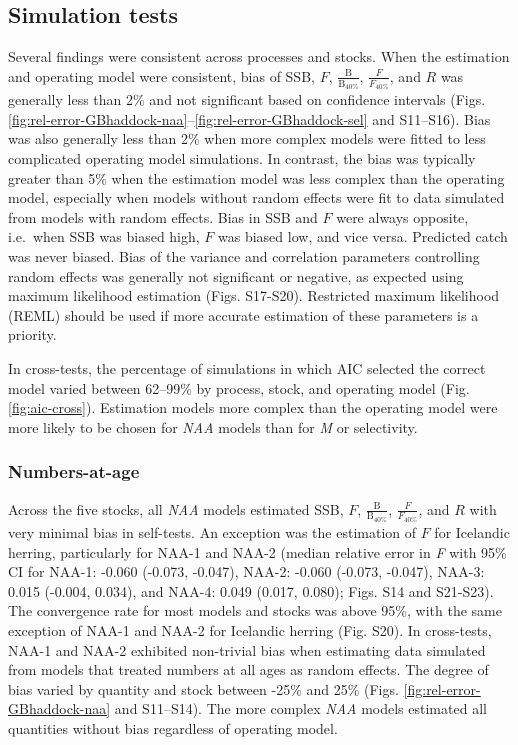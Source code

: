 \documentclass[]{article}
\begin{document}
\hypertarget{simulation-tests-1}{%
\subsection{Simulation tests}\label{simulation-tests-1}}

Several findings were consistent across processes and stocks. When the
estimation and operating model were consistent, bias of SSB, \(F\),
\(\frac{\text{B}}{\text{B}_{40\%}}\), \(\frac{F}{F_{40\%}}\), and \(R\)
was generally less than 2\% and not significant based on confidence
intervals (Figs.
\ref{fig:rel-error-GBhaddock-naa}--\ref{fig:rel-error-GBhaddock-sel} and
S11--S16). Bias was also generally less than 2\% when more complex
models were fitted to less complicated operating model simulations. In
contrast, the bias was typically greater than 5\% when the estimation
model was less complex than the operating model, especially when models
without random effects were fit to data simulated from models with
random effects. Bias in SSB and \(F\) were always opposite, i.e.~when
SSB was biased high, \(F\) was biased low, and vice versa. Predicted
catch was never biased. Bias of the variance and correlation parameters
controlling random effects was generally not significant or negative, as
expected using maximum likelihood estimation (Figs. S17-S20). Restricted
maximum likelihood (REML) should be used if more accurate estimation of
these parameters is a priority.

In cross-tests, the percentage of simulations in which AIC selected the
correct model varied between 62--99\% by process, stock, and operating
model (Fig. \ref{fig:aic-cross}). Estimation models more complex than
the operating model were more likely to be chosen for \emph{NAA} models
than for \emph{M} or selectivity.

\hypertarget{numbers-at-age}{%
\subsubsection{Numbers-at-age}\label{numbers-at-age}}

Across the five stocks, all \emph{NAA} models estimated SSB, \(F\),
\(\frac{\text{B}}{\text{B}_{40\%}}\), \(\frac{F}{F_{40\%}}\), and \(R\)
with very minimal bias in self-tests. An exception was the estimation of
\(F\) for Icelandic herring, particularly for NAA-1 and NAA-2 (median
relative error in \emph{F} with 95\% CI for NAA-1: -0.060 (-0.073,
-0.047), NAA-2: -0.060 (-0.073, -0.047), NAA-3: 0.015 (-0.004, 0.034),
and NAA-4: 0.049 (0.017, 0.080); Figs. S14 and S21-S23). The convergence
rate for most models and stocks was above 95\%, with the same exception
of NAA-1 and NAA-2 for Icelandic herring (Fig. S20). In cross-tests,
NAA-1 and NAA-2 exhibited non-trivial bias when estimating data
simulated from models that treated numbers at all ages as random
effects. The degree of bias varied by quantity and stock between -25\%
and 25\% (Figs. \ref{fig:rel-error-GBhaddock-naa} and S11--S14). The
more complex \emph{NAA} models estimated all quantities without bias
regardless of operating model.
\end{document}
